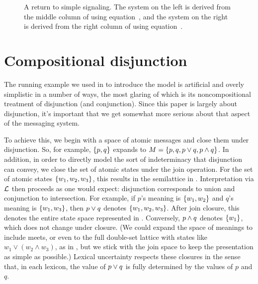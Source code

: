 \documentclass{article}
\begin{document}
\begin{figure}[tp]
  \centering
   \caption{A return to simple signaling. The system on the left is
     derived from the middle column of  using
     equation~, and the system on the right is derived
     from the right column of  using
     equation~.}
  \label{fig:simple}
\end{figure}


\section{Compositional disjunction}\label{sec:composition}

The running example we used in  to introduce the
model is artificial and overly simplistic in a number of ways, the
most glaring of which is its noncompositional treatment of disjunction
(and conjunction). Since this paper is largely about disjunction, it's
important that we get somewhat more serious about that aspect of the
messaging system.

To achieve this, we begin with a space of atomic messages and close
them under disjunction. So, for example, $\left\{ p, q \right\}$ expands to
$M = \left\{ p, q, p \vee q, p \wedge q \right\}$. In addition, in order to
directly model the sort of indeterminacy that disjunction can convey,
we close the set of atomic states under the join operation.  For the
set of atomic states $\left\{ w_{1}, w_{2}, w_{3} \right\}$, this results in the
semilattice in . Interpretation via $\mathcal{L}$ then
proceeds as one would expect: disjunction corresponds to union and
conjunction to intersection. For example, if $p$'s meaning is
$\left\{ w_{1}, w_{2} \right\}$ and $q$'s meaning is $\left\{ w_{1}, w_{3} \right\}$, then
$p \vee q$ denotes $\left\{ w_{1}, w_{2}, w_{3} \right\}$.  After join closure, this
denotes the entire state space represented in
. Conversely, $p \wedge q$ denotes $\left\{ w_{1} \right\}$,
which does not change under closure. (We could expand the space of
meanings to include meets, or even to the full double-set lattice with
states like $w_{1} \vee (w_{2} \wedge w_{3})$, as in
\citealt{levy-pollard:2001}, but we stick with the join space to keep
the presentation as simple as possible.) Lexical uncertainty respects
these closures in the sense that, in each lexicon, the value of
$p \vee q$ is fully determined by the values of $p$ and $q$.
\end{document}
